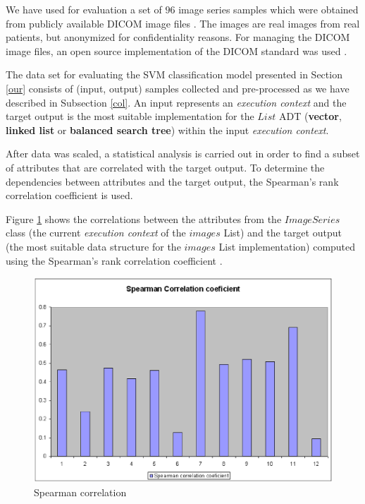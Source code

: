 We have used for evaluation a set of $96$ image series samples which were obtained from publicly available DICOM image files \cite{im1, im2, im3, im4, im5}. The images are real images from real patients, but anonymized for confidentiality reasons. For managing the DICOM image files, an open source implementation of the DICOM standard was used \cite{im6}.

The data set for evaluating the SVM classification model presented in Section \ref{our} consists of (input, output) samples collected and pre-processed as we have described in Subsection \ref{col}. An input represents an \emph{execution context} and the target output is the most suitable implementation for the $List$ ADT (\textbf{vector}, \textbf{linked list} or \textbf{balanced search tree}) within the input \emph{execution context}. 

After data was scaled, a statistical analysis is carried out in order to find a subset of attributes that are correlated with the target output. To determine the dependencies between attributes and the target output, the Spearman's rank correlation coefficient \cite{spearman} is used.   


Figure \ref{cor} shows the correlations between the attributes from the $ImageSeries$ class (the current \emph{execution context} of the $images$ List) and the target output (the most suitable data structure for the $images$ List implementation) computed using the Spearman's rank correlation coefficient \cite{spearman}. 

\noindent\begin{figure}[h]
   \centering
       \includegraphics[scale=0.28]{cor2.eps}
              \caption{Spearman correlation}
 \label{cor}
\end{figure}

